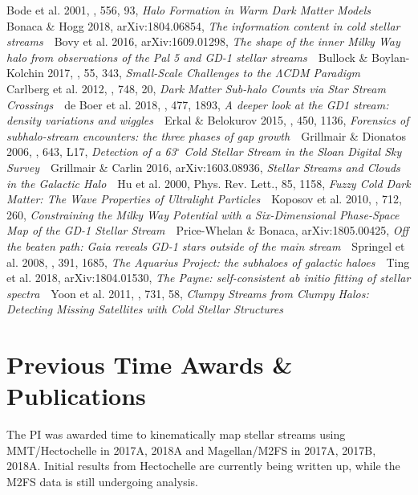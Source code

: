 \documentclass[12pt]{article}
\begin{document}
{Bode et al. 2001, \apj, 556, 93, \emph{Halo Formation in Warm Dark Matter Models} \,\textbullet\,
Bonaca \& Hogg 2018, arXiv:1804.06854, \emph{The information content in cold stellar streams} \,\textbullet\,
Bovy et al. 2016, arXiv:1609.01298, \emph{The shape of the inner Milky Way halo from observations of the Pal 5 and GD-1 stellar streams} \,\textbullet\,
Bullock \& Boylan-Kolchin 2017, \araa, 55, 343, \emph{Small-Scale Challenges to the ΛCDM Paradigm} \,\textbullet\,
Carlberg et al. 2012, \apj, 748, 20, \emph{Dark Matter Sub-halo Counts via Star Stream Crossings} \,\textbullet\,
de Boer et al. 2018, \mnras, 477, 1893, \emph{A deeper look at the GD1 stream: density variations and wiggles} \,\textbullet\,
Erkal \& Belokurov 2015, \mnras, 450, 1136, \emph{Forensics of subhalo-stream encounters: the three phases of gap growth} \,\textbullet\,
Grillmair \& Dionatos 2006, \apj, 643, L17, \emph{Detection of a 63$^\circ$ Cold Stellar Stream in the Sloan Digital Sky Survey} \,\textbullet\,
Grillmair \& Carlin 2016, arXiv:1603.08936, \emph{Stellar Streams and Clouds in the Galactic Halo} \,\textbullet\,
Hu et al. 2000, Phys. Rev. Lett., 85, 1158, \emph{Fuzzy Cold Dark Matter: The Wave Properties of Ultralight Particles} \,\textbullet\,
Koposov et al. 2010, \apj, 712, 260, \emph{Constraining the Milky Way Potential with a Six-Dimensional Phase-Space Map of the GD-1 Stellar Stream} \,\textbullet\,
Price-Whelan \& Bonaca, arXiv:1805.00425, \emph{Off the beaten path: Gaia reveals GD-1 stars outside of the main stream} \,\textbullet\,
Springel et al. 2008, \mnras, 391, 1685, \emph{The Aquarius Project: the subhaloes of galactic haloes} \,\textbullet\,
Ting et al. 2018, arXiv:1804.01530, \emph{The Payne: self-consistent ab initio fitting of stellar spectra} \,\textbullet\,
Yoon et al. 2011, \apj, 731, 58, \emph{Clumpy Streams from Clumpy Halos: Detecting Missing Satellites with Cold Stellar Structures}
}

\section*{Previous Time Awards \& Publications}\vskip-0.2in

The PI was awarded time to kinematically map stellar streams using MMT/Hectochelle in 2017A, 2018A and Magellan/M2FS in 2017A, 2017B, 2018A.
Initial results from Hectochelle are currently being written up, while the M2FS data is still undergoing analysis.
\vskip-0.7in
\end{document}
